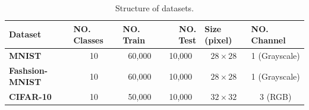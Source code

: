 \begin{table}[]
  \label{dataset_table}
  \begin{tabular}{
      l |
      c
      c
      c
      c
      c}
    \hline
    {\textbf{Dataset}}        & \multicolumn{1}{l}{{\textbf{NO. Classes}}} & \multicolumn{1}{l}{{\textbf{NO. Train}}} & \multicolumn{1}{r}{{\textbf{NO. Test}}} & \multicolumn{1}{l}{{\textbf{Size (pixel)}}} & \multicolumn{1}{l}{{\textbf{NO. Channel}}} \\ \hline
    {\textbf{MNIST}}          & 10                                         & 60,000
                              & 10,000                                     & $28\times28$                             & 1
    (Grayscale)                                                                                                                                                                                                                                            \\
    {\textbf{Fashsion-MNIST}} & 10                                         & 60,000
                              & 10,000                                     & $28\times28$
                              & 1 (Grayscale)                                                                                                                                                                                                              \\
    {\textbf{CIFAR-10}}       & 10                                         & 50,000
                              & 10,000                                     & $32\times32$                             & 3
    (RGB)                                                                                                                                                                                                                                                  \\ \hline
  \end{tabular}
  \caption{Structure of datasets.}
\end{table}




